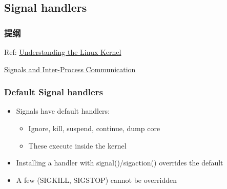 \subsection{Signal handlers} %
\begin{frame}
\frametitle{提纲} %
\tableofcontents %

\pause

Ref: 
\href{http://ermak.cs.nstu.ru/understanding.linux.kernel.pdf }{Understanding the Linux Kernel}

\href{https://compas.cs.stonybrook.edu/~nhonarmand/courses/fa14/cse506.2/slides/ipc.pdf}{Signals and Inter-Process Communication}
\end{frame}
\begin{frame}[fragile]
    \frametitle{Default Signal handlers}
    \begin{itemize}
        \item Signals have default handlers:
        \begin{itemize}
            \item Ignore, kill, suspend, continue, dump core
            \item These execute inside the kernel \pause
        \end{itemize}
        \item Installing a handler with signal()/sigaction() overrides the default
        \item A few (SIGKILL, SIGSTOP) cannot be overridden
    \end{itemize}
\end{frame}
% 
% 
